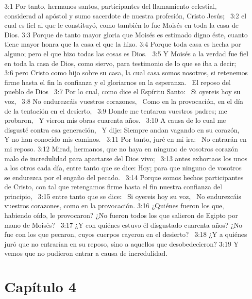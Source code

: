 3:1 Por tanto, hermanos santos, participantes del llamamiento celestial, considerad al apóstol y sumo sacerdote de nuestra profesión, Cristo Jesús;  
3:2 el cual es fiel al que le constituyó, como también lo fue Moisés en toda la casa de Dios. 
3:3 Porque de tanto mayor gloria que Moisés es estimado digno éste, cuanto tiene mayor honra que la casa el que la hizo. 
3:4 Porque toda casa es hecha por alguno; pero el que hizo todas las cosas es Dios.  
3:5 Y Moisés a la verdad fue fiel en toda la casa de Dios, como siervo, para testimonio de lo que se iba a decir;  
3:6 pero Cristo como hijo sobre su casa, la cual casa somos nosotros, si retenemos firme hasta el fin la confianza y el gloriarnos en la esperanza.  
El reposo del pueblo de Dios  
3:7 Por lo cual, como dice el Espíritu Santo:  
Si oyereis hoy su voz,  
3:8 No endurezcáis vuestros corazones,  
Como en la provocación, en el día de la tentación en el desierto,  
3:9 Donde me tentaron vuestros padres; me probaron,  
Y vieron mis obras cuarenta años.  
3:10 A causa de lo cual me disgusté contra esa generación,  
Y dije: Siempre andan vagando en su corazón,  
Y no han conocido mis caminos.  
3:11 Por tanto, juré en mi ira:  
No entrarán en mi reposo. 
3:12 Mirad, hermanos, que no haya en ninguno de vosotros corazón malo de incredulidad para apartarse del Dios vivo;  
3:13 antes exhortaos los unos a los otros cada día, entre tanto que se dice: Hoy; para que ninguno de vosotros se endurezca por el engaño del pecado.  
3:14 Porque somos hechos participantes de Cristo, con tal que retengamos firme hasta el fin nuestra confianza del principio,  
3:15 entre tanto que se dice:  
Si oyereis hoy su voz,  
No endurezcáis vuestros corazones, como en la provocación. 
3:16 ¿Quiénes fueron los que, habiendo oído, le provocaron? ¿No fueron todos los que salieron de Egipto por mano de Moisés?  
3:17 ¿Y con quiénes estuvo él disgustado cuarenta años? ¿No fue con los que pecaron, cuyos cuerpos cayeron en el desierto?  
3:18 ¿Y a quiénes juró que no entrarían en su reposo, sino a aquellos que desobedecieron? 
3:19 Y vemos que no pudieron entrar a causa de incredulidad.  
\section*{Capítulo 4}

